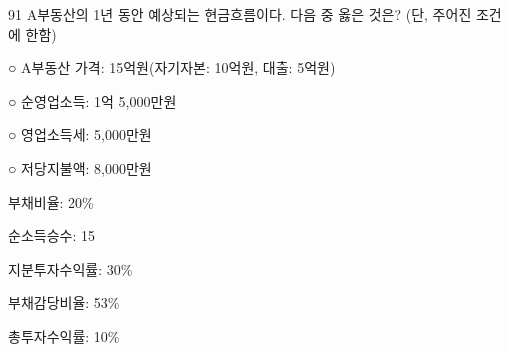 \begin{question}{91}
A부동산의 1년 동안 예상되는 현금흐름이다. 다음 중 옳은 것은? (단, 주어진 조건에 한함)
\begin{framedtext}
○ A부동산 가격: 15억원(자기자본: 10억원, 대출: 5억원) \par
○ 순영업소득: 1억 5,000만원 \par
○ 영업소득세: 5,000만원 \par
○ 저당지불액: 8,000만원
\end{framedtext}
\begin{choices}
  \item 부채비율: 20\%
  \item 순소득승수: 15
  \item 지분투자수익률: 30\%
  \item 부채감당비율: 53\%
  \item 총투자수익률: 10\%
\end{choices}
\end{question}
